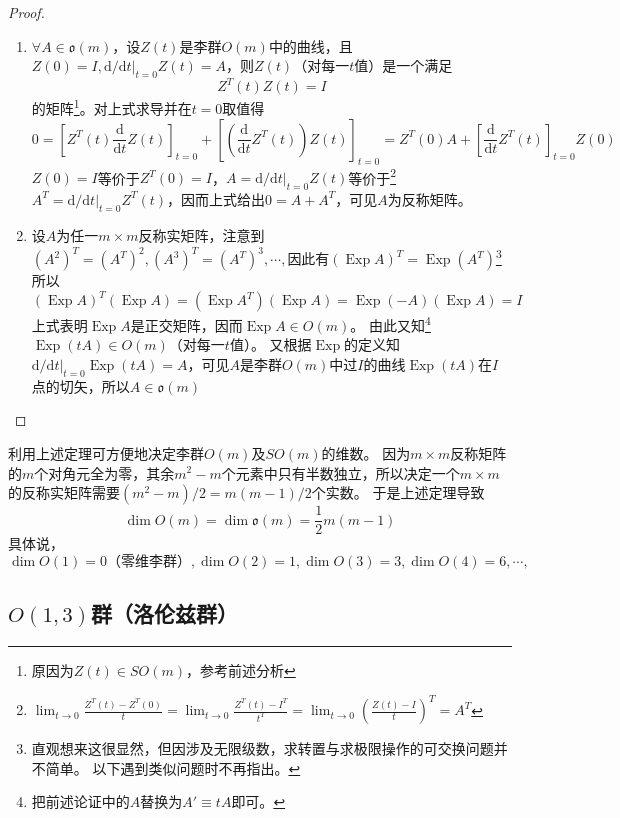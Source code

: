 \begin{proof}
    \begin{enumerate}[（A）]
        \item $\forall A \in \mathfrak{o}(m)$，设$Z(t)$是李群$O(m)$中的曲线，且$Z(0) = I, \mathrm{d} / \mathrm{d}t|_{t = 0}Z(t) = A$，则$Z(t)$（对每一$t$值）是一个满足
        $$Z^T(t)Z(t) = I$$
        的矩阵\footnote{
            原因为$Z(t) \in SO(m)$，参考前述分析
        }。对上式求导并在$t = 0$取值得
        $$0 = \left[Z^T(t)\frac{\mathrm{d}}{\mathrm{d}t}Z(t)\right]_{t = 0} + \left[\left(\frac{\mathrm{d}}{\mathrm{d}t}Z^T(t)\right)Z(t)\right]_{t = 0} = Z^T(0)A + \left[\frac{\mathrm{d}}{\mathrm{d}t}Z^T(t)\right]_{t = 0}Z(0)$$
        $Z(0) = I$等价于$Z^T(0) = I$，$A = \mathrm{d} / \mathrm{d}t|_{t = 0}Z(t)$等价于\footnote{
            $\displaystyle\lim_{t \to 0} \frac{Z^T(t) - Z^T(0)}{t} = \lim_{t \to 0} \frac{Z^T(t) - I^T}{t^T} = \lim_{t \to 0}(\frac{Z(t) - I}{t})^T = A^T$
        }$A^T = \mathrm{d} / \mathrm{d}t|_{t = 0}Z^T(t)$，因而上式给出$0 = A + A^T$，可见$A$为反称矩阵。
        \item 设$A$为任一$m \times m$反称实矩阵，注意到$(A^2)^T = (A^T)^2, (A^3)^T = (A^T)^3, \cdots, $因此有$(\operatorname{Exp}A)^T = \operatorname{Exp}(A^T)$\footnote{
            直观想来这很显然，但因涉及无限级数，求转置与求极限操作的可交换问题并不简单。
            以下遇到类似问题时不再指出。
        }所以
        $$(\operatorname{Exp}A)^T(\operatorname{Exp}A) = (\operatorname{Exp}A^T)(\operatorname{Exp}A) = \operatorname{Exp}(-A)(\operatorname{Exp}A) = I$$
        上式表明$\operatorname{Exp}A$是正交矩阵，因而$\operatorname{Exp}A \in O(m)$。
        由此又知\footnote{
            把前述论证中的$A$替换为$A' \equiv tA$即可。
        }$\operatorname{Exp}(tA) \in O(m)$（对每一$t$值）。
        又根据$\operatorname{Exp}$的定义知$\mathrm{d} / \mathrm{d}t|_{t = 0}\operatorname{Exp}(tA) = A$，可见$A$是李群$O(m)$中过$I$的曲线$\operatorname{Exp}(tA)$在$I$点的切矢，所以$A \in \mathfrak{o}(m)$
    \end{enumerate}
\end{proof}

利用上述定理可方便地决定李群$O(m)$及$SO(m)$的维数。
因为$m \times m$反称矩阵的$m$个对角元全为零，其余$m^2 - m$个元素中只有半数独立，所以决定一个$m \times m$的反称实矩阵需要$(m^2 - m) / 2 = m(m - 1) / 2$个实数。
于是上述定理导致
$$\dim O(m) = \dim\mathfrak{o}(m) = \frac{1}{2}m(m - 1)$$
具体说，
$$\dim O(1) = 0\text{（零维李群）}, \dim O(2) = 1, \dim O(3) = 3, \dim O(4) = 6, \cdots, $$

\subsection{$O(1, 3)$群（洛伦兹群）}

